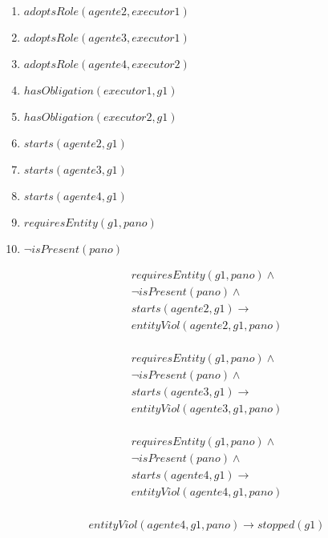 \begin{enumerate}
	\item $adoptsRole(agente2,executor1)$ 
	\item $adoptsRole(agente3,executor1)$	 	
	\item $adoptsRole(agente4,executor2)$	 
	\item $hasObligation(executor1,g1)$
	\item $hasObligation(executor2,g1)$
	\item $starts(agente2,g1)$ 
	\item $starts(agente3,g1)$	 	
	\item $starts(agente4,g1)$	
	\item $requiresEntity(g1,pano)$		
	\item $\neg isPresent(pano)$
\end{enumerate}

\begin{eqnarray}\nonumber
	requiresEntity(g1,pano) \wedge \nonumber \\   
	\neg isPresent(pano) \wedge \nonumber \\ 
	starts(agente2,g1) \to \nonumber \\ 
    entityViol(agente2,g1,pano)  \nonumber \\
\end{eqnarray}

\begin{eqnarray}\nonumber
	requiresEntity(g1,pano) \wedge \nonumber \\   
	\neg isPresent(pano) \wedge \nonumber \\ 
	starts(agente3,g1) \to \nonumber \\ 
    entityViol(agente3,g1,pano)  \nonumber \\
\end{eqnarray}

\begin{eqnarray}\nonumber
	requiresEntity(g1,pano) \wedge \nonumber \\   
	\neg isPresent(pano) \wedge \nonumber \\ 
	starts(agente4,g1) \to \nonumber \\ 
    entityViol(agente4,g1,pano)  \nonumber \\	
\end{eqnarray}

\begin{eqnarray}
	entityViol(agente4,g1,pano) \to stopped(g1)
\end{eqnarray}



